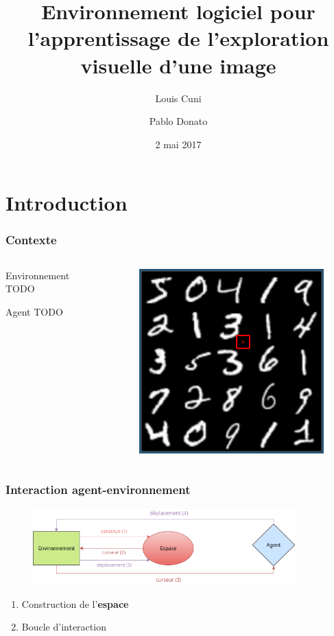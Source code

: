 \documentclass{beamer}
\title[Environnement pour l'exploration visuelle]{Environnement logiciel pour l'apprentissage de l'exploration visuelle d'une image}
\author{Louis Cuni \and Pablo Donato}
\institute[]{Université Pierre et Marie Curie -- Paris VI}
\date{2 mai 2017}
\begin{document}
\frame{\titlepage}

\section{Introduction}

\begin{frame}
    \frametitle{Contexte}
    \begin{columns}[T]
        \begin{column}{.48\textwidth}
            \center
            \begin{block}{Environnement}
                TODO
            \end{block}
            \begin{block}{Agent}
                TODO
            \end{block}
        \end{column}
        \begin{column}{.48\textwidth}
            \begin{figure}
                \includegraphics[height=0.5\textheight]{numgrid.png}
            \end{figure}
        \end{column}
    \end{columns}
\end{frame}

\begin{frame}
    \frametitle{Interaction agent-environnement}
    \center
    \begin{figure}
        \includegraphics[width=0.9\textwidth]{agent_env_loop.png}
    \end{figure}
    \vspace{3em}
    \begin{enumerate}
        \item Construction de l'\textbf{espace}
        \item Boucle d'interaction
    \end{enumerate}
\end{frame}
\end{document}
